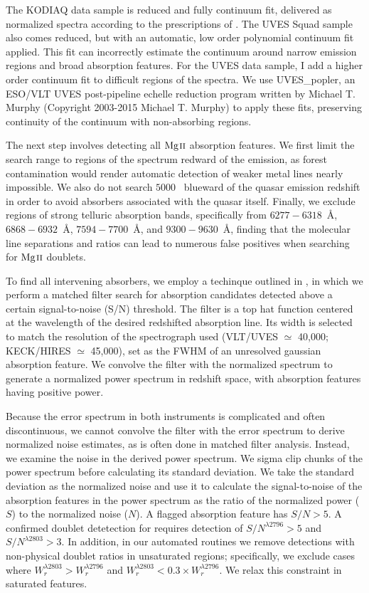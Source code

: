 \documentclass[iop,apj,numberedappendix,appendixfloats,twocolappendix]{emulateapj}
\begin{document}
The KODIAQ data sample is reduced and fully continuum fit, delivered as normalized spectra according to the prescriptions of \cite{OMeara2015}. The UVES Squad sample also comes reduced, but with an automatic, low order polynomial continuum fit applied. This fit can incorrectly estimate the continuum around narrow emission regions and broad absorption features. For the UVES data sample, I add a higher order continuum fit to difficult regions of the spectra. We use UVES\_popler, an ESO/VLT UVES post-pipeline echelle reduction program written by Michael T. Murphy (Copyright 2003-2015 Michael T. Murphy) to apply these fits, preserving continuity of the continuum with non-absorbing regions. 

The next step involves detecting all ${\hbox{{\rm Mg}\kern 0.1em{\sc ii}}}$ absorption features. We first limit the search range to regions of the spectrum redward of the {\Lya} emission, as {\Lya} forest contamination would render automatic detection of weaker metal lines nearly impossible. We also do not search $5000$~{\kms} blueward of the quasar emission redshift in order to avoid absorbers associated with the quasar itself. Finally, we exclude regions of strong telluric absorption bands, specifically from $6277 - 6318$~{\AA}, $6868 - 6932$~{\AA}, $7594 - 7700$~{\AA}, and $9300 - 9630$~{\AA}, finding that the molecular line separations and ratios can lead to numerous false positives when searching for ${\hbox{{\rm Mg}\kern 0.1em{\sc ii}}}$ doublets. 

To find all intervening {\MgIIdblt} absorbers, we employ a techinque outlined in \cite{Zhu2013}, in which we perform a matched filter search for absorption candidates detected above a certain signal-to-noise (S/N) threshold. The filter is a top hat function centered at the wavelength of the desired redshifted absorption line. Its width is selected to match the resolution of the spectrograph used (VLT/UVES $\simeq$ 40,000; KECK/HIRES $\simeq$ 45,000), set as the FWHM of an unresolved gaussian absorption feature. We convolve the filter with the normalized spectrum to generate a normalized power spectrum in redshift space, with absorption features having positive power. 

Because the error spectrum in both instruments is complicated and often discontinuous, we cannot convolve the filter with the error spectrum to derive normalized noise estimates, as is often done in matched filter analysis. Instead, we examine the noise in the derived power spectrum. We sigma clip chunks of the power spectrum before calculating its standard deviation. We take the standard deviation as the normalized noise and use it to calculate the signal-to-noise of the absorption features in the power spectrum as the ratio of the normalized power ($S$) to the normalized noise ($N$). A flagged absorption feature has $S/N > 5$. A confirmed doublet detetection for {\MgIIdblt} requires detection of $S/N^{\lambda2796} > 5$ and $S/N^{\lambda2803} > 3$. In addition, in our automated routines we remove detections with non-physical doublet ratios in unsaturated regions; specifically, we exclude cases where $W_r^{\lambda2803} > W_r^{\lambda2796}$ and $W_r^{\lambda2803} < 0.3 \times W_r^{\lambda2796}$. We relax this constraint in saturated features. 
\end{document}
